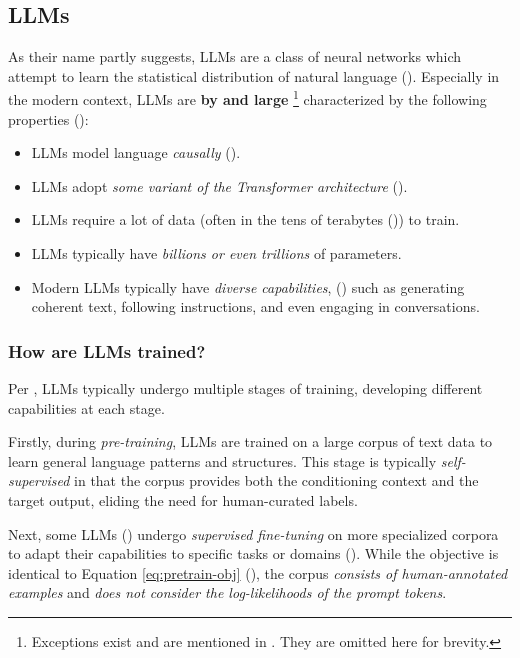 \documentclass{article} %
\theoremstyle{definition}
\begin{document}
\subsection{LLMs}
As their name partly suggests, LLMs are a class of neural networks 
which attempt to learn the statistical distribution of natural language
(\cite{Zhao-et-al-2023, Karpathy-2025}). Especially in the modern context,
LLMs are \textbf{by and large} \footnote{Exceptions exist and are mentioned in \cite{wk5}. They are omitted here for brevity.} characterized by the following properties (\cite{wk5}):
\begin{itemize}
    \item LLMs model language \textit{causally} (\cite{Jurafsky-2024, Karpathy-2025}).
    \item LLMs adopt \textit{some variant of the Transformer architecture} (\cite{Vaswani-et-al-2017}).
    \item LLMs require a lot of data (often in the tens of terabytes (\cite{Karpathy-2025})) to train.
    \item LLMs typically have \textit{billions or even trillions} of parameters.
    \item Modern LLMs typically have \textit{diverse capabilities}, (\cite{Brown-et-al-2020})
        such as generating coherent text, following instructions, 
        and even engaging in conversations.
\end{itemize}

\subsubsection{How are LLMs trained?}
Per \cite{Karpathy-2025}, LLMs typically undergo multiple stages of training,
developing different capabilities at each stage.

Firstly, during \textit{pre-training}, LLMs are trained on a large corpus of text data
to learn general language patterns and structures.
This stage is typically \textit{self-supervised} in that the corpus
provides both the conditioning context and the target output, eliding
the need for human-curated labels.

Next, some LLMs (\cite{InstructGPT-2022}) undergo \textit{supervised fine-tuning} on more specialized corpora to adapt 
their capabilities to specific tasks or domains (\cite{radford-et-al-2019,Brown-et-al-2020}).
While the objective is identical to Equation \eqref{eq:pretrain-obj} (\cite{wk5}),
the corpus \textit{consists of human-annotated examples} and \textit{does not consider the log-likelihoods of the prompt tokens}.
\end{document}
